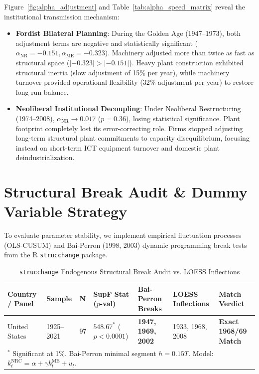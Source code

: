\documentclass[11pt,a4paper]{article}
\begin{document}
Figure~\ref{fig:alpha_adjustment} and Table~\ref{tab:alpha_speed_matrix} reveal the institutional transmission mechanism:
\begin{itemize}
    \item \textbf{Fordist Bilateral Planning}: During the Golden Age (1947--1973), both adjustment terms are negative and statistically significant ($\alpha_{\text{NR}} = -0.151, \alpha_{\text{ME}} = -0.323$). Machinery adjusted more than twice as fast as structural space ($|-0.323| > |-0.151|$). Heavy plant construction exhibited structural inertia (slow adjustment of 15\% per year), while machinery turnover provided operational flexibility (32\% adjustment per year) to restore long-run balance.
    \item \textbf{Neoliberal Institutional Decoupling}: Under Neoliberal Restructuring (1974--2008), $\alpha_{\text{NR}} \to 0.017$ ($p = 0.36$), losing statistical significance. Plant footprint completely lost its error-correcting role. Firms stopped adjusting long-term structural plant commitments to capacity disequilibrium, focusing instead on short-term ICT equipment turnover and domestic plant deindustrialization.
\end{itemize}

\FloatBarrier
\section{Structural Break Audit \& Dummy Variable Strategy}

To evaluate parameter stability, we implement empirical fluctuation processes (OLS-CUSUM) and Bai-Perron (1998, 2003) dynamic programming break tests from the R \texttt{strucchange} package.

\begin{table}[h!]
\centering
\small
\caption{\texttt{strucchange} Endogenous Structural Break Audit vs. LOESS Inflections}
\label{tab:strucchange_audit}
\begin{tabular}{p{2.2cm} p{1.2cm} p{0.6cm} p{2.4cm} p{2.6cm} p{2.6cm} p{2.0cm}}
\toprule
\textbf{Country / Panel} & \textbf{Sample} & \textbf{N} & \textbf{SupF Stat ($p$-val)} & \textbf{Bai-Perron Breaks} & \textbf{LOESS Inflections} & \textbf{Match Verdict} \\
\midrule
United States & 1925--2021 & 97 & $548.67^*$ ($p < 0.0001$) & \textbf{1947, 1969, 2002} & 1933, 1968, 2008 & \textbf{Exact 1968/69 Match} \\
\bottomrule
\multicolumn{7}{p{14.8cm}}{\footnotesize $^*$ Significant at 1\%. Bai-Perron minimal segment $h = 0.15T$. Model: $k_t^{\text{NRC}} = \alpha + \gamma k_t^{\text{ME}} + u_t$.}
\end{tabular}
\end{table}
\end{document}
